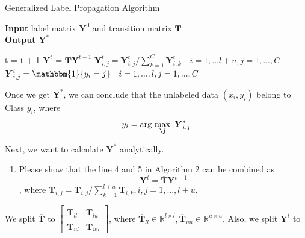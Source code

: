 \documentclass{article}
\begin{document}
\begin{algorithm}
  \caption{Generalized Label Propagation Algorithm}
  \label{alg:generalized_label_propagation_algorithm}
  \hspace*{\algorithmicindent} \textbf{Input}  label matrix $\boldsymbol{Y}^0$ and transition matrix $\boldsymbol{T}$ \\
  \hspace*{\algorithmicindent} \textbf{Output} $\boldsymbol{Y}^*$
  \begin{algorithmic}[1]
    \Repeat
        \State t = t + 1
        \State $\boldsymbol{Y}^{t}$ = $\boldsymbol{T} \boldsymbol{Y}^{t-1}$ 
        \State $\boldsymbol{Y}^{t}_{i,j} = \boldsymbol{Y}^{t}_{i,j} / \sum_{k=1}^{C} \boldsymbol{Y}^{t}_{i,k} \quad i=1,...l+u ,j=1,...,C$ 
        \State $\boldsymbol{Y}^{t}_{i,j}= \mathbbm{1}\{y_i=j\} \quad i = 1,...,l, j = 1,...,C$ 
    \EndProcedure
   \end{algorithmic}
\end{algorithm}

\newpage
Once we get $\boldsymbol{Y}^{*}$, we can conclude that the unlabeled data $(x_i,y_i)$ belong to Class $y_i$, where
$$y_i= \text{arg}\,\max\limits_{\j}\ \boldsymbol{Y}^{*}_{i,j}$$

Next, we want to calculate $\boldsymbol{Y}^{*}$ analytically.

\begin{enumerate}[resume]
\item Please show that the line 4 and 5 in Algorithm 2 can be combined as
$$\boldsymbol{Y}^{t} = \boldsymbol{\overline{T}} \boldsymbol{Y}^{t-1}$$, where
$\boldsymbol{\overline{T}}_{i,j}=\boldsymbol{T}_{i,j}/\sum_{k=1}^{l+u} \boldsymbol{T}_{i,k}, i,j=1,...,l+u$.
\end{enumerate}
We split $\boldsymbol{\overline{T}}$ to 
$\begin{bmatrix}
\boldsymbol{\overline{T}}_{ll} & \boldsymbol{\overline{T}}_{lu}\\
\boldsymbol{\overline{T}}_{ul} & \boldsymbol{\overline{T}}_{uu}
\end{bmatrix}$, where $\boldsymbol{\overline{T}}_{ll} \in \mathbb{R}^{l \times l}, \boldsymbol{\overline{T}}_{uu} \in \mathbb{R}^{u \times u}$. Also, we split $\boldsymbol{Y}^{t}$ to
\end{document}
